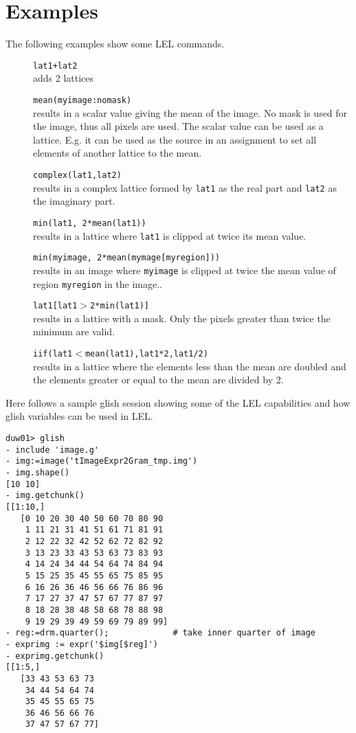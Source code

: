\section{Examples}
The following examples show some LEL commands.
\begin{description}
  \item[] \texttt{lat1+lat2}
    \\adds 2 lattices
  \item[] \texttt{mean(myimage:nomask)}
    \\results in a scalar value giving the mean of the image.
    No mask is used for the image, thus all pixels are used.
    The scalar value can be used as a lattice. E.g. it can be used as
    the source in an assignment to set all elements of another
    lattice to the mean.
  \item[] \texttt{complex(lat1,lat2)}
    \\results in a complex lattice formed by \texttt{lat1} as the
    real part and \texttt{lat2} as the imaginary part.
  \item[] \texttt{min(lat1, 2*mean(lat1))}
    \\results in a lattice where \texttt{lat1} is clipped at twice
    its mean value.
  \item[] \texttt{min(myimage, 2*mean(mymage[myregion]))}
    \\results in an image where \texttt{myimage} is clipped at twice
    the mean value of region \texttt{myregion} in the image..
  \item[] \texttt{lat1[lat1$>$2*min(lat1)]}
    \\results in a lattice with a mask. Only the pixels
    greater than twice the minimum are valid.
  \item[] \texttt{iif(lat1$<$mean(lat1),lat1*2,lat1/2)}
    \\results in a lattice where the elements less than the mean
    are doubled and the elements greater or equal to the mean are
    divided by 2.
\end{description}
Here follows a sample glish session showing some of the LEL
capabilities and how glish variables can be used in LEL.
\begin{verbatim}
duw01> glish
- include 'image.g'
- img:=image('tImageExpr2Gram_tmp.img')
- img.shape()
[10 10]
- img.getchunk()
[[1:10,]
   [0 10 20 30 40 50 60 70 80 90
    1 11 21 31 41 51 61 71 81 91
    2 12 22 32 42 52 62 72 82 92
    3 13 23 33 43 53 63 73 83 93
    4 14 24 34 44 54 64 74 84 94
    5 15 25 35 45 55 65 75 85 95
    6 16 26 36 46 56 66 76 86 96
    7 17 27 37 47 57 67 77 87 97
    8 18 28 38 48 58 68 78 88 98
    9 19 29 39 49 59 69 79 89 99] 
- reg:=drm.quarter();             # take inner quarter of image
- exprimg := expr('$img[$reg]')
- exprimg.getchunk()
[[1:5,]
   [33 43 53 63 73
    34 44 54 64 74
    35 45 55 65 75
    36 46 56 66 76
    37 47 57 67 77]
\end{verbatim}

